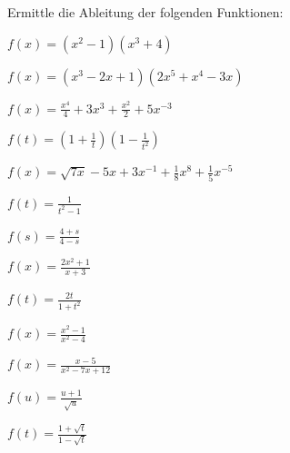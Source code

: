 \documentclass[%
11pt,%
twoside,%
titlepage,%
german,%
headsepline%
]{scrartcl}
\begin{document}
\clearpage

\begin{ueb}\label{uebableitungen}
Ermittle die Ableitung der folgenden Funktionen:

\begin{minipage}{9cm}
\begin{enumeratea}
\item $f(x)=(x^2-1)(x^3+4)$
\item $f(x)=(x^3-2x+1)(2x^5+x^4-3x)$
\item $f(x)=\frac{x^4}{4}+3x^3+\frac{x^2}{2}+5x^{-3}$
\item $f(t)=(1+\frac{1}{t})(1-\frac{1}{t^2})$
\item $f(x)=\sqrt{7x}-5x+3x^{-1}+\frac{1}{8}x^8+\frac{1}{5}x^{-5}$
\item $f(t)=\frac{1}{t^2-1}$
\item $f(s)=\frac{4+s}{4-s}$
\end{enumeratea}
\end{minipage}
\begin{minipage}{6cm}
\begin{enumeratea}
\addtocounter{enumi}{7}
\item $f(x)=\frac{2x^2+1}{x+3}$
\item $f(t)=\frac{2t}{1+t^2}$
\item $f(x)=\frac{x^2-1}{x^2-4}$
\item $f(x)=\frac{x-5}{x^2-7x+12}$
\item $f(u)=\frac{u+1}{\sqrt{u}}$
\item $f(t)=\frac{1+\sqrt{t}}{1-\sqrt{t}}$
\end{enumeratea}
\end{minipage}
\end{ueb}
\end{document}
